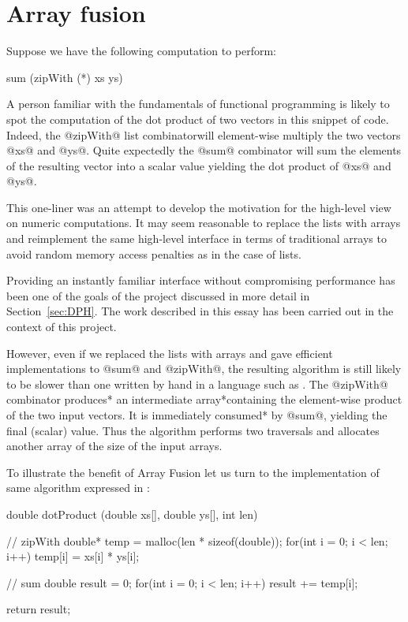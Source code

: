 \documentclass[preamble.tex]{subfiles}
\begin{document}
\clearpage

\chapter{Array fusion}
\label{ch:Fusion}

Suppose we have the following computation to perform:

\begin{hscode}
sum (zipWith (*) xs ys)
\end{hscode}

A person familiar with the fundamentals of functional programming is likely to spot the computation of the dot product of two vectors in this snippet of \Haskell code. Indeed, the @zipWith@ list combinator\icomb will element-wise multiply the two vectors @xs@ and @ys@. Quite expectedly the @sum@ combinator will sum the elements of the resulting vector into a scalar value yielding the dot product of @xs@ and @ys@.

This one-liner was an attempt to develop the motivation for the high-level view on numeric computations. It may seem reasonable to replace the lists with arrays and reimplement the same high-level interface in terms of traditional arrays to avoid random memory access penalties as in the case of lists.

Providing an instantly familiar interface without compromising performance has been one of the goals of the \idph project \cite{PLKC08,CLP+07} discussed in more detail in Section~\ref{sec:DPH}. The work described in this essay has been carried out in the context of this project.

However, even if we replaced the lists with arrays and gave efficient implementations to @sum@ and @zipWith@, the resulting algorithm is still likely to be slower than one written by hand in a language such as \C. The @zipWith@ combinator \*produces* an \*intermediate array*\iintermediate containing the element-wise product of the two input vectors. It is immediately \*consumed* by @sum@, yielding the final (scalar) value. Thus the algorithm performs two traversals and allocates another array of the size of the input arrays.

To illustrate the benefit of Array Fusion let us turn to the implementation of same algorithm expressed in \C:


\begin{ccode}
double dotProduct (double xs[], double ys[], int len) {
	// zipWith
	double* temp = malloc(len * sizeof(double));
	for(int i = 0; i < len; i++)
		temp[i] = xs[i] * ys[i];

	// sum
	double result = 0;
	for(int i = 0; i < len; i++)
		result += temp[i];

	return result;
}
\end{ccode}
\end{document}
